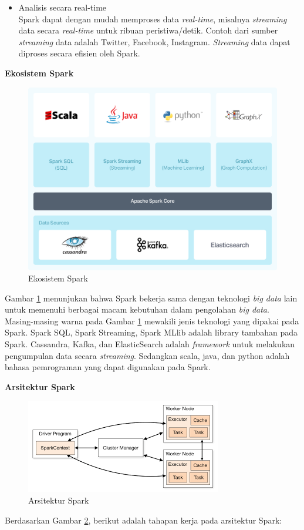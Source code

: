 \documentclass[a4paper,twoside]{article}
\begin{document}
\begin{enumerate}
\begin{itemize}
\item Analisis secara real-time\\
Spark dapat dengan mudah memproses data \textit{real-time}, misalnya \textit{streaming} data secara \textit{real-time} untuk ribuan peristiwa/detik. Contoh dari sumber \textit{streaming} data adalah Twitter, Facebook, Instagram. \textit{Streaming} data dapat diproses secara efisien oleh Spark.
\end{itemize}

\textbf{Ekosistem Spark}
\begin{figure}[H]
	\centering
	\includegraphics[scale=0.18]{spark_ecosystem}
	\caption{Ekosistem Spark}
	\label{fig:spark_ecosystem}
\end{figure}
Gambar \ref{fig:spark_ecosystem} menunjukan bahwa Spark bekerja sama dengan teknologi \textit{big data} lain untuk memenuhi berbagai macam kebutuhan dalam pengolahan \textit{big data}. Masing-masing warna pada Gambar \ref{fig:spark_ecosystem} mewakili jenis teknologi yang dipakai pada Spark. Spark SQL, Spark Streaming, Spark MLlib adalah library tambahan pada Spark. Cassandra, Kafka, dan ElasticSearch adalah \textit{framework} untuk melakukan pengumpulan data secara \textit{streaming}. Sedangkan scala, java, dan python adalah bahasa pemrograman yang dapat digunakan pada Spark.

\textbf{Arsitektur Spark}

\begin{figure}[H]
	\centering
	\includegraphics[scale=0.78]{arsitektur_spark2}
	\caption{Arsitektur Spark}
	\label{fig:arsitektur_spark2}
\end{figure}
Berdasarkan Gambar \ref{fig:arsitektur_spark2}, berikut adalah tahapan kerja pada arsitektur Spark:


\end{enumerate}
\end{document}
